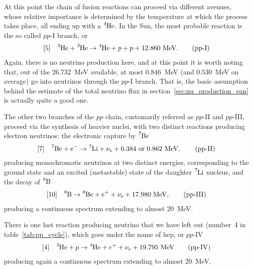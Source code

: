 At this point the chain of fusion reactions can proceed via different avenues,
whose relative importance is determined by the temperature at which the process
takes place, all ending up with a $\ce{^4He}$. In the Sun, the most probable
reaction is the so called $pp$-I branch, or
\begin{align}
  \text{[5]} \quad \ce{^3He} + \ce{^3He} \rightarrow \ce{^4He} + p + p + 12.860~\text{MeV}.
  \tag{pp\text{-I}}
\end{align}
Again, there is no neutrino production here, and at this point it is worth noting
that, out of the $26.732$~MeV available, at most $0.846$~MeV (and $0.530$~MeV on
average) go into neutrinos through the $pp$-I branch. That is, the basic
assumption behind the estimate of the total neutrino flux in
section~\ref{sec:nu_production_sun} is actually quite a good one.

The other two branches of the $pp$ chain, customarily referred as $pp$-II and
$pp$-III, proceed via the synthesis of heavier nuclei, with two distinct reactions
producing electron neutrinos: the electronic capture by $\ce{^7Be}$
\begin{align}
  \text{[7]} \quad
  \ce{^7Be} + e^- \rightarrow \ce{^7Li} + \nu_e + 0.384~\text{or}~0.862~\text{MeV},
  \tag{pp\text{-II}}
\end{align}
producing monochromatic neutrinos at two distinct energies,
corresponding to the ground state and an excited (metastable) state of the daughter
$\ce{^7Li}$ nucleus, and the decay of $\ce{^8B}$
\begin{align}
  \text{[10]} \quad
  \ce{^8B} \rightarrow \ce{^8Be} + e^+ + \nu_e + 17.980~\text{MeV},
  \tag{pp\text{-III}}
\end{align}
producing a continuous spectrum extending to almost 20~MeV.

There is one last reaction producing neutrino that we have left out (number~4 in
table~\ref{tab:pp_cycle}), which goes under the name of hep, or $pp$-IV
\begin{align}
  \text{[4]} \quad
  \ce{^3He} + p \rightarrow \ce{^4He} + e^+ + \nu_e + 19.795~\text{MeV}
  \tag{pp\text{-IV}}
\end{align}
producing again a continuous spectrum extending to almost 20~MeV.


